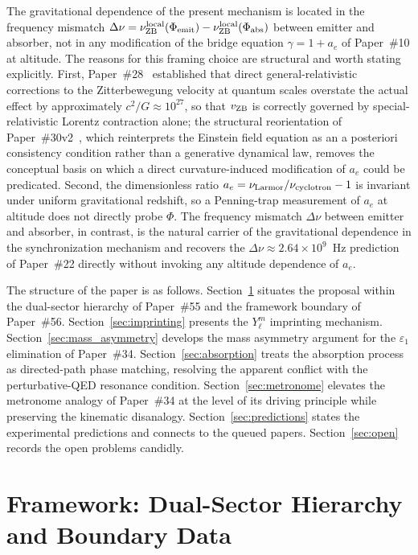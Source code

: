 \documentclass[%
 reprint, amsmath,amssymb, aps, prb, ]{revtex4-2}
\numberwithin{equation}{section}
\newcommand{\nuZBl}{\nu_{\text{ZB}}^{\rm local}}
\begin{document}
The gravitational dependence of the present mechanism is located in the frequency mismatch $\Delta\nu = \nuZBl(\Phi_{\rm emit}) - \nuZBl(\Phi_{\rm abs})$ between emitter and absorber, not in any modification of the bridge equation $\gamma = 1 + a_e$ of Paper~\#10 at altitude. The reasons for this framing choice are structural and worth stating explicitly. First, Paper~\#28~\cite{hanamura28} established that direct general-relativistic corrections to the Zitterbewegung velocity at quantum scales overstate the actual effect by approximately $c^2/G \approx 10^{27}$, so that $v_{\rm ZB}$ is correctly governed by special-relativistic Lorentz contraction alone; the structural reorientation of Paper~\#30v2~\cite{hanamura30v2}, which reinterprets the Einstein field equation as an a posteriori consistency condition rather than a generative dynamical law, removes the conceptual basis on which a direct curvature-induced modification of $a_e$ could be predicated. Second, the dimensionless ratio $a_e = \nu_{\rm Larmor}/\nu_{\rm cyclotron} - 1$ is invariant under uniform gravitational redshift, so a Penning-trap measurement of $a_e$ at altitude does not directly probe $\Phi$. The frequency mismatch $\Delta\nu$ between emitter and absorber, in contrast, is the natural carrier of the gravitational dependence in the synchronization mechanism and recovers the $\Delta\nu \approx 2.64\times 10^9$~Hz prediction of Paper~\#22 directly without invoking any altitude dependence of $a_e$.

The structure of the paper is as follows. Section~\ref{sec:framework} situates the proposal within the dual-sector hierarchy of Paper~\#55 and the framework boundary of Paper~\#56. Section~\ref{sec:imprinting} presents the $Y_\ell^m$ imprinting mechanism. Section~\ref{sec:mass_asymmetry} develops the mass asymmetry argument for the $\varepsilon_1$ elimination of Paper~\#34. Section~\ref{sec:absorption} treats the absorption process as directed-path phase matching, resolving the apparent conflict with the perturbative-QED resonance condition. Section~\ref{sec:metronome} elevates the metronome analogy of Paper~\#34 at the level of its driving principle while preserving the kinematic disanalogy. Section~\ref{sec:predictions} states the experimental predictions and connects to the queued papers. Section~\ref{sec:open} records the open problems candidly.

\section{Framework: Dual-Sector Hierarchy and Boundary Data}
\label{sec:framework}
\end{document}
